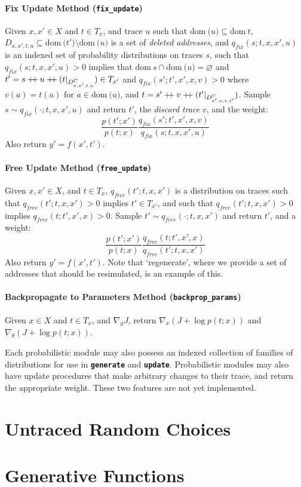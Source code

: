\documentclass{article}
\newcommand{\code}[1]{\texttt{\small{\textbf{#1}}}}
\newcommand\doubleplus{\mathbin{+\mkern-5mu+}}
\newcommand{\concat}[0]{\doubleplus}
\newcommand{\dom}[1]{\mbox{dom}{~#1}}
\begin{document}
\paragraph{Fix Update Method (\code{fix\_update})}
Given $x, x' \in X$ and $t \in T_x$, and trace $u$ such that $\dom(u) \subseteq \dom{t}$, $D_{x,x',t,u} \subseteq \dom(t') \setminus \dom(u)$ is a set of \emph{deleted addresses}, and $q_{fix}(s; t, x, x', u)$ is an indexed set of probability distributions on traces $s$, such that $q_{fix}(s; t, x, x', u) > 0$ implies that $\dom{s} \cap \dom(u) = \varnothing$ and $t' = s \concat u \concat (t|_{D_{x,x',t,u}^C}) \in T_{x'}$ and $q_{fix}(s'; t', x', x, v) > 0$ where $v(a) = t(a)$ for $a \in \dom(u)$, and $t = s' \concat v \concat (t' |_{D_{x',x,v,t'}^C})$.
Sample $s \sim q_{fix}(\cdot; t, x, x', u)$ and return $t'$, the \emph{discard trace} $v$, and the weight:
\[
\frac{p(t'; x')}{p(t; x)} \frac{q_{fix}(s'; t', x', x, v)}{q_{fix}(s; t, x, x', u)}
\]
Also return $y' = f(x', t')$.

\paragraph{Free Update Method (\code{free\_update})}
Given $x, x' \in X$, and $t \in T_x$, $q_{free}(t'; t, x, x')$ is a distribution on traces such that $q_{free}(t'; t, x, x') > 0$ implies $t' \in T_{x'}$, and such that $q_{free}(t'; t, x, x') > 0$ implies $q_{free}(t; t', x', x) > 0$.
Sample $t' \sim q_{free}(\cdot; t, x, x')$ and return $t'$, and a weight:
\[
    \frac{p(t'; x')}{p(t; x)} \frac{q_{free}(t; t', x', x)}{q_{free}(t'; t, x, x')}
\]
Also return $y' = f(x', t')$.
Note that `regenerate', where we provide a set of addresses that should be resimulated, is an example of this.

\paragraph{Backpropagate to Parameters Method (\code{backprop\_params})}
Given $x \in X$ and $t \in T_x$, and $\nabla_y J$, return $\nabla_x (J + \log p(t; x))$ and $\nabla_{\theta} (J + \log p(t; x))$.


Each probabilistic module may also possess an indexed collection of families of distributions for use in \code{generate} and \code{update}.
Probabilistic modules may also have update procedures that make arbitrary changes to their trace, and return the appropriate weight.
These two features are not yet implemented.

\section{Untraced Random Choices}

\section{Generative Functions}

\clearpage


\end{document}
